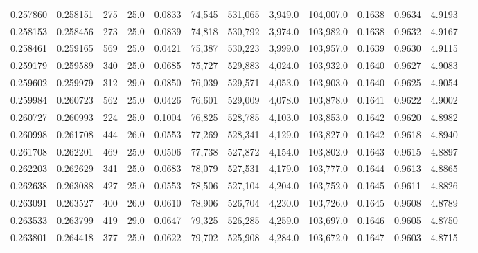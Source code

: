 \begin{tabular}{rrrrrrrrrrrrr}
0.257860 & 0.258151 &   275 & 25.0 &                                     0.0833 &  74,545 & 531,065 &   3,949.0 & 104,007.0 & 0.1638 & 0.9634 & 4.9193 \\
0.258153 & 0.258456 &   273 & 25.0 &                                     0.0839 &  74,818 & 530,792 &   3,974.0 & 103,982.0 & 0.1638 & 0.9632 & 4.9167 \\
0.258461 & 0.259165 &   569 & 25.0 &                                     0.0421 &  75,387 & 530,223 &   3,999.0 & 103,957.0 & 0.1639 & 0.9630 & 4.9115 \\
0.259179 & 0.259589 &   340 & 25.0 &                                     0.0685 &  75,727 & 529,883 &   4,024.0 & 103,932.0 & 0.1640 & 0.9627 & 4.9083 \\
0.259602 & 0.259979 &   312 & 29.0 &                                     0.0850 &  76,039 & 529,571 &   4,053.0 & 103,903.0 & 0.1640 & 0.9625 & 4.9054 \\
0.259984 & 0.260723 &   562 & 25.0 &                                     0.0426 &  76,601 & 529,009 &   4,078.0 & 103,878.0 & 0.1641 & 0.9622 & 4.9002 \\
0.260727 & 0.260993 &   224 & 25.0 &                                     0.1004 &  76,825 & 528,785 &   4,103.0 & 103,853.0 & 0.1642 & 0.9620 & 4.8982 \\
0.260998 & 0.261708 &   444 & 26.0 &                                     0.0553 &  77,269 & 528,341 &   4,129.0 & 103,827.0 & 0.1642 & 0.9618 & 4.8940 \\
0.261708 & 0.262201 &   469 & 25.0 &                                     0.0506 &  77,738 & 527,872 &   4,154.0 & 103,802.0 & 0.1643 & 0.9615 & 4.8897 \\
0.262203 & 0.262629 &   341 & 25.0 &                                     0.0683 &  78,079 & 527,531 &   4,179.0 & 103,777.0 & 0.1644 & 0.9613 & 4.8865 \\
0.262638 & 0.263088 &   427 & 25.0 &                                     0.0553 &  78,506 & 527,104 &   4,204.0 & 103,752.0 & 0.1645 & 0.9611 & 4.8826 \\
0.263091 & 0.263527 &   400 & 26.0 &                                     0.0610 &  78,906 & 526,704 &   4,230.0 & 103,726.0 & 0.1645 & 0.9608 & 4.8789 \\
0.263533 & 0.263799 &   419 & 29.0 &                                     0.0647 &  79,325 & 526,285 &   4,259.0 & 103,697.0 & 0.1646 & 0.9605 & 4.8750 \\
0.263801 & 0.264418 &   377 & 25.0 &                                     0.0622 &  79,702 & 525,908 &   4,284.0 & 103,672.0 & 0.1647 & 0.9603 & 4.8715 \\

\end{tabular}
